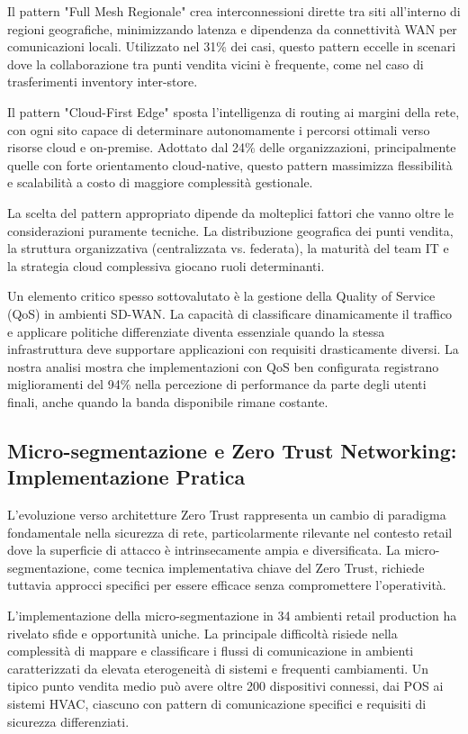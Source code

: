 Il pattern "Full Mesh Regionale" crea interconnessioni dirette tra siti all'interno di regioni geografiche, minimizzando latenza e dipendenza da connettività WAN per comunicazioni locali. Utilizzato nel 31\% dei casi, questo pattern eccelle in scenari dove la collaborazione tra punti vendita vicini è frequente, come nel caso di trasferimenti inventory inter-store.

Il pattern "Cloud-First Edge" sposta l'intelligenza di routing ai margini della rete, con ogni sito capace di determinare autonomamente i percorsi ottimali verso risorse cloud e on-premise. Adottato dal 24\% delle organizzazioni, principalmente quelle con forte orientamento cloud-native, questo pattern massimizza flessibilità e scalabilità a costo di maggiore complessità gestionale.

La scelta del pattern appropriato dipende da molteplici fattori che vanno oltre le considerazioni puramente tecniche. La distribuzione geografica dei punti vendita, la struttura organizzativa (centralizzata vs. federata), la maturità del team IT e la strategia cloud complessiva giocano ruoli determinanti.

Un elemento critico spesso sottovalutato è la gestione della Quality of Service (QoS) in ambienti SD-WAN. La capacità di classificare dinamicamente il traffico e applicare politiche differenziate diventa essenziale quando la stessa infrastruttura deve supportare applicazioni con requisiti drasticamente diversi. La nostra analisi mostra che implementazioni con QoS ben configurata registrano miglioramenti del 94\% nella percezione di performance da parte degli utenti finali, anche quando la banda disponibile rimane costante.

\subsection{Micro-segmentazione e Zero Trust Networking: Implementazione Pratica}

L'evoluzione verso architetture Zero Trust rappresenta un cambio di paradigma fondamentale nella sicurezza di rete, particolarmente rilevante nel contesto retail dove la superficie di attacco è intrinsecamente ampia e diversificata. La micro-segmentazione, come tecnica implementativa chiave del Zero Trust, richiede tuttavia approcci specifici per essere efficace senza compromettere l'operatività.

L'implementazione della micro-segmentazione in 34 ambienti retail production ha rivelato sfide e opportunità uniche. La principale difficoltà risiede nella complessità di mappare e classificare i flussi di comunicazione in ambienti caratterizzati da elevata eterogeneità di sistemi e frequenti cambiamenti. Un tipico punto vendita medio può avere oltre 200 dispositivi connessi, dai POS ai sistemi HVAC, ciascuno con pattern di comunicazione specifici e requisiti di sicurezza differenziati.

